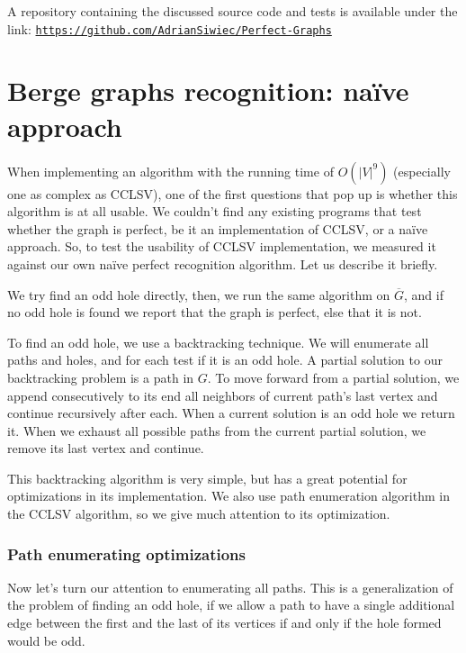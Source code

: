 A repository containing the discussed source code and tests is available under the link: \href{https://github.com/AdrianSiwiec/Perfect-Graphs}{\texttt{https://github.com/AdrianSiwiec/Perfect-Graphs}}

\section{Berge graphs recognition: na\"ive approach}
When implementing an algorithm with the running time of $O(|V|^9)$ (especially one as complex as CCLSV), one of the first questions that pop up is whether this algorithm is at all usable. We couldn't find any existing programs that test whether the graph is perfect, be it an implementation of CCLSV, or a na\"ive approach. So, to test the usability of CCLSV implementation, we measured it against our own na\"ive perfect recognition algorithm. Let us describe it briefly.

We try find an odd hole directly, then, we run the same algorithm on $\overline{G}$, and if no odd hole is found we report that the graph is perfect, else that it is not.

To find an odd hole, we use a backtracking technique. We will enumerate all paths and holes, and for each test if it is an odd hole. A partial solution to our backtracking problem is a path in $G$. To move forward from a partial solution, we append consecutively to its end all neighbors of current path's last vertex and continue recursively after each. When a current solution is an odd hole we return it. When we exhaust all possible paths from the current partial solution, we remove its last vertex and continue.

This backtracking algorithm is very simple, but has a great potential for optimizations in its implementation. We also use path enumeration algorithm in the CCLSV algorithm, so we give much attention to its optimization.

\subsubsection{Path enumerating optimizations}
Now let's turn our attention to enumerating all paths. This is a generalization of the problem of finding an odd hole, if we allow a path to have a single additional edge between the first and the last of its vertices if and only if the hole formed would be odd.

